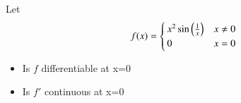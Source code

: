 \documentclass[journal,12pt,twocolumn]{IEEEtran}
\begin{document}
%
\begin{problem}
Let 
\begin{equation}
f(x)=
 \begin{cases} 
      x^2\sin\left(\frac{1}{x}\right) & x \neq 0 \\
      0 & x=0  
   \end{cases}
\end{equation}
\begin{itemize}
\item Is $f$ differentiable at x=0
\item Is $f'$ continuous at x=0
\end{itemize}
\end{problem}
\end{document}
